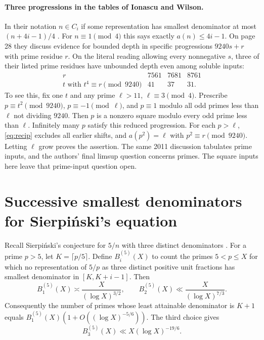 \documentclass[a4paper,11pt]{article}
\theoremstyle{definition}\newtheorem{question}[theorem]{Question}
\begin{document}
\paragraph{Three progressions in the tables of Ionascu and Wilson.}
In their notation $n\in C_i$ if some representation has smallest denominator at most $(n+4i-1)/4$ \cite{iw}. For $n\equiv1\pmod4$ this says exactly $a(n)\le4i-1$. On page 28 they discuss evidence for bounded depth in specific progressions $9240s+r$ with prime residue $r$. On the literal reading allowing every nonnegative $s$, three of their listed prime residues have unbounded depth even among soluble inputs:
\[
 \begin{array}{c|rrr}
 r &7561&7681&8761\\ \hline
 t\text{ with }t^4\equiv r\pmod{9240}&41&37&31 .
 \end{array}
\]
To see this, fix one $t$ and any prime $\ell>11$, $\ell\equiv3\pmod4$. Prescribe $p\equiv t^2\pmod{9240}$, $p\equiv-1\pmod\ell$, and $p\equiv1$ modulo all odd primes less than $\ell$ not dividing $9240$. Then $p$ is a nonzero square modulo every odd prime less than $\ell$. Infinitely many $p$ satisfy this reduced progression. For each $p>\ell$, \eqref{eq:recip} excludes all earlier shifts, and $a(p^2)=\ell$ with $p^2\equiv r\pmod{9240}$. Letting $\ell$ grow proves the assertion. The same 2011 discussion tabulates prime inputs, and the authors' final limsup question concerns primes. The square inputs here leave that prime-input question open.


\section{Successive smallest denominators for Sierpi\'nski's equation}
Recall Sierpi\'nski's conjecture for $5/n$ with three distinct denominators \cite{graham}. For a prime $p>5$, let $K=\lceil p/5\rceil$. Define $B_i^{(5)}(X)$
to count the primes $5<p\le X$ for which no representation of $5/p$ as
three distinct positive unit fractions has smallest denominator in
$[K,K+i-1]$. Then
\begin{equation}\label{eq:sierp-first-two}
 B_1^{(5)}(X)\asymp\frac{X}{(\log X)^{3/2}},
 \qquad B_2^{(5)}(X)\ll\frac{X}{(\log X)^{7/3}} .
\end{equation}
Consequently the number of primes whose least attainable denominator is
$K+1$ equals $B_1^{(5)}(X)(1+O((\log X)^{-5/6}))$.
The third choice gives
\[
 B_3^{(5)}(X)\ll X(\log X)^{-19/6}.
\]
\end{document}
